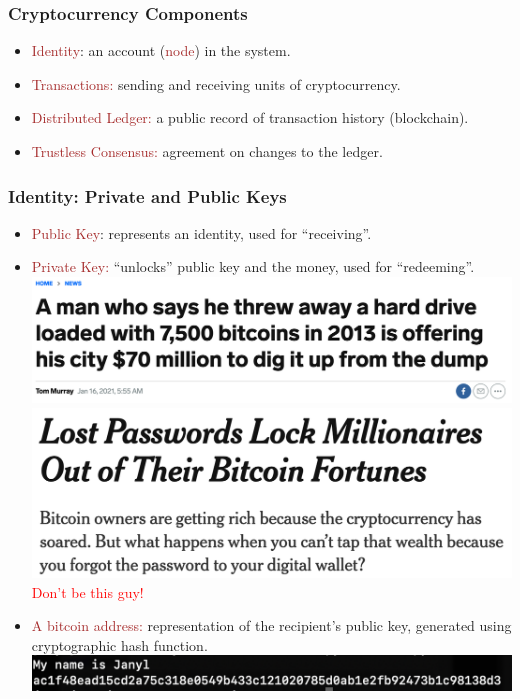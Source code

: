 \documentclass{beamer}
\begin{document}
\begin{frame}
  \frametitle{Cryptocurrency Components}
	\begin{itemize}
		\item \textcolor{brown}{Identity}:  an account (\textcolor{brown}{node}) in the system.
		\item \textcolor{brown}{Transactions:} sending and receiving  units of cryptocurrency.
		\item \textcolor{brown}{Distributed Ledger:} a public record of transaction history (blockchain).
		\item \textcolor{brown}{Trustless Consensus:} agreement on changes to the ledger.
	\end{itemize}
\end{frame}
\begin{frame}
  \frametitle{Identity: Private and Public Keys}
	\begin{itemize}
		\item \textcolor{brown}{Public Key}:  represents an identity, used for ``receiving''.
		\item \textcolor{brown}{Private Key:}  ``unlocks'' public key and the money, used for ``redeeming''. \\
	\pause
	\includegraphics[scale=0.2]{trash}
	\includegraphics[scale=0.2]{password}
	\textcolor{red}{Don't be this guy!}
	\pause
		\item  \textcolor{brown}{A bitcoin address:} representation of the recipient's public key, generated using cryptographic hash function. \\
		
			\includegraphics[scale=0.5]{hash}
	\end{itemize}
\end{frame}
\end{document}
